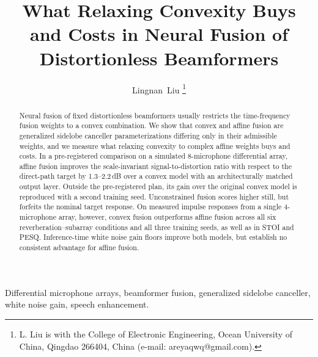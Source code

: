 \documentclass[journal]{IEEEtran}
\begin{document}
\title{What Relaxing Convexity Buys and Costs in Neural Fusion of Distortionless Beamformers}
\author{Lingnan~Liu%
\thanks{L. Liu is with the College of Electronic Engineering, Ocean University of China, Qingdao 266404, China (e-mail: areyaqwq@gmail.com).}}
\maketitle

\begin{abstract}
Neural fusion of fixed distortionless beamformers usually restricts the time-frequency fusion weights to a convex combination. We show that convex and affine fusion are generalized sidelobe canceller parameterizations differing only in their admissible weights, and we measure what relaxing convexity to complex affine weights buys and costs. In a pre-registered comparison on a simulated 8-microphone differential array, affine fusion improves the scale-invariant signal-to-distortion ratio with respect to the direct-path target by 1.3--2.2\,dB over a convex model with an architecturally matched output layer. Outside the pre-registered plan, its gain over the original convex model is reproduced with a second training seed. Unconstrained fusion scores higher still, but forfeits the nominal target response. On measured impulse responses from a single 4-microphone array, however, convex fusion outperforms affine fusion across all six reverberation--subarray conditions and all three training seeds, as well as in STOI and PESQ. Inference-time white noise gain floors improve both models, but establish no consistent advantage for affine fusion.
\end{abstract}
\begin{IEEEkeywords}
Differential microphone arrays, beamformer fusion, generalized sidelobe canceller, white noise gain, speech enhancement.
\end{IEEEkeywords}
\end{document}
